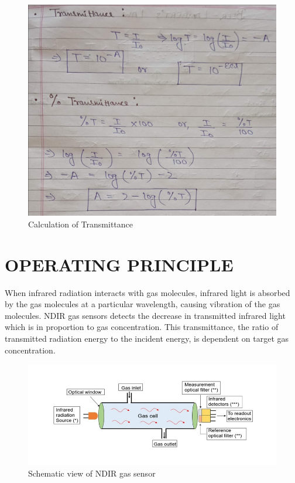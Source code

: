 \documentclass[12pt]{article}
\begin{document}
\begin{figure}[h]
\centering
\includegraphics[scale=0.7]{lambert.jpg}
\caption{Calculation of Transmittance}
\end{figure}

\section{OPERATING PRINCIPLE}
When infrared radiation interacts with gas molecules, infrared light is absorbed by the gas molecules at a particular wavelength, causing vibration of the gas molecules. NDIR gas sensors detects the decrease in transmitted infrared light which is in proportion to gas concentration. This transmittance, the ratio of transmitted radiation energy to the incident energy, is dependent on target gas concentration.

\begin{figure}[h]
\centering
\includegraphics[scale=0.7]{NDIR.jpg}
\caption{Schematic view of NDIR gas sensor}
\end{figure}
\end{document}
